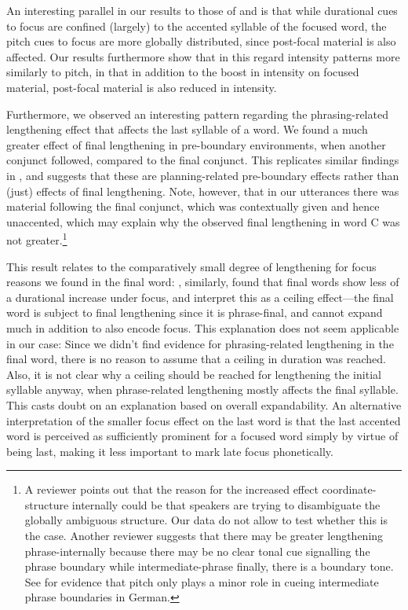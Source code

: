 \documentclass[preprint,review,12pt,authoryear,times]{elsarticle}
\begin{document}
An interesting parallel in our results to those of \citet{coope85} and \citet{eady86} is that while durational cues to focus are confined (largely) to the accented syllable of the focused word, the pitch cues to focus are more globally distributed, since post-focal material is also affected. Our results furthermore show that in this regard intensity patterns more similarly to pitch, in that in addition to the boost in intensity on focused material, post-focal material is also reduced in intensity.

Furthermore, we observed an interesting pattern regarding the phrasing-related lengthening effect that affects the last syllable of a word. We found a much greater effect of final lengthening in pre-boundary environments, when another conjunct followed, compared to the final conjunct. This replicates similar findings in \citet{wagner05recursion}, and suggests that these are planning-related pre-boundary effects rather than (just) effects of final lengthening. Note, however, that in our utterances there was material following the final conjunct, which was contextually given and hence unaccented, which may explain why the observed final lengthening in word C was not greater.\footnote{A reviewer points out that the reason for the increased effect coordinate-structure internally could be that speakers are trying to disambiguate the globally ambiguous structure. Our data do not allow to test whether this is the case. Another reviewer suggests that there may be greater lengthening phrase-internally because there may be no clear tonal cue signalling the phrase boundary while intermediate-phrase finally, there is a boundary tone. See \citet{gollr13} for evidence that pitch only plays a minor role in cueing intermediate phrase boundaries in German.} 

This result relates to the comparatively small degree of lengthening for focus reasons we found in the final word: \citet{coope85}, similarly,  found that final words show less of a durational increase under focus, and interpret this as a ceiling effect---the final word is subject to final lengthening since it is phrase-final, and cannot expand much in addition to also encode focus. This explanation does not seem applicable in our case:  Since we didn't find evidence for phrasing-related  lengthening in the final word, there is no reason to assume that a ceiling in duration was reached. Also, it is not clear why a ceiling should be reached for lengthening the initial syllable anyway, when phrase-related lengthening mostly affects the final syllable. This casts doubt on an explanation based on overall expandability. An alternative interpretation of the smaller focus effect on the last word is that the last accented word is perceived as sufficiently prominent for a focused word simply by virtue of being last, making it less important to mark late focus phonetically. 
\end{document}
